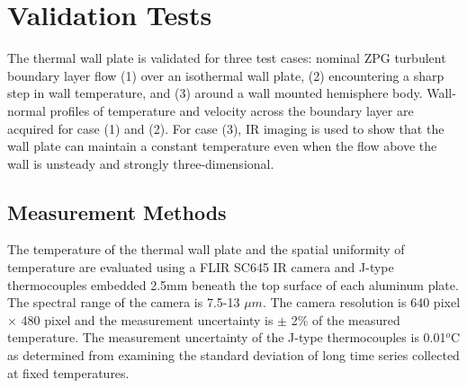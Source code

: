 \section{Validation Tests}
The thermal wall plate is validated for three test cases: nominal ZPG turbulent boundary layer flow (1) over an isothermal wall plate, (2) encountering a sharp step in wall temperature, and (3) around a wall mounted hemisphere body.  Wall-normal profiles of temperature and velocity across  the boundary layer are acquired for case (1) and (2). For case (3), IR imaging is used to show that the wall plate can maintain a constant temperature even when the flow above the wall is unsteady and strongly three-dimensional. 

\subsection{Measurement Methods}
The temperature of the thermal wall plate and the spatial uniformity of temperature are evaluated using a FLIR SC645 IR camera and J-type thermocouples embedded 2.5mm beneath the top surface of each aluminum plate. The spectral range of the camera is 7.5-13 $\mu m$. The camera resolution is 640 pixel $\times$ 480 pixel and the measurement uncertainty is $\pm$ 2\% of the measured temperature. The measurement uncertainty of the J-type thermocouples is 0.01$^o$C as determined from examining the standard deviation of long time series collected at fixed temperatures. 


